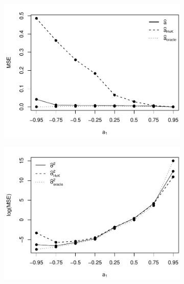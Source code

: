 \begin{figure}[t!]
\begin{subfigure}[b]{0.475\textwidth}
\includegraphics[width=\textwidth]{Plots/MSE_a1_T=250_slope=100_(L1,L2,K1,K2,M1,M2)=(25,25,5,10,20,30).pdf}
\end{subfigure}\hspace{0.25cm}
\begin{subfigure}[b]{0.475\textwidth}
\includegraphics[width=\textwidth]{Plots/MSE_lrv_T=250_slope=10_(L1,L2,K1,K2,M1,M2)=(25,25,5,10,20,30).pdf}
\end{subfigure}


\end{figure}
